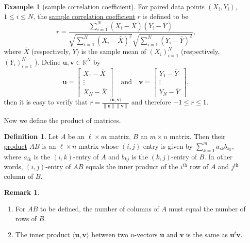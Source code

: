 \documentclass[12pt,letterpaper]{book}
\numberwithin{equation}{section}
\theoremstyle{definition}
\newtheorem{defi}[thm]{\textbf{Definition}}
\newtheorem{example}[thm]{\textbf{Example}}
\newtheorem{remark}[thm]{\textbf{Remark}}
\newcommand{\vu}{\bm{u}}
\newcommand{\vv}{\bm{v}}
\begin{document}
\begin{example}[sample correlation coefficient]
For paired data points $(X_i,Y_i)$, $1\leq i \leq N$, the \underline{sample correlation coefficient} $r$ is defined to be
$$r=\frac{\sum_{i=1}^N (X_i-\bar{X})(Y_i-\bar{Y})}{\sqrt{\sum_{i=1}^N (X_i-\bar{X})^2}\sqrt{\sum_{i=1}^N (Y_i-\bar{Y})^2}},$$ where $\bar{X}$ (respectively, $\bar{Y}$) is the sample mean of $(X_i)_{i=1}^N$ (respectively, $(Y_i)_{i=1}^N$ ). Define $\vu,\vv\in \mathbb{R}^N$ by
$$\vu=\left[\begin{array}{c} X_1-\bar{X}\\ \vdots \\ X_N-\bar{X} \end{array}\right]\quad\text{and}\quad \vv=\left[\begin{array}{c} Y_1-\bar{Y}\\ \vdots \\ Y_N-\bar{Y} \end{array}\right],$$ then it is easy to verify that $r=\frac{\langle \vu,\vv\rangle}{\|\vu\|\|\vv\|}$ and therefore $-1\leq r \leq 1$.
\end{example}

Now we define the product of matrices.

\begin{defi} Let $A$ be an $\ell\times m$ matrix, $B$ an
$m\times n$ matrix. Then their \underline{product} $AB$ is an $\ell\times n$
matrix whose $(i,j)$-entry is given by $\sum_{k=1}^m a_{ik}b_{kj}$,
where $a_{ik}$ is the $(i,k)$-entry of $A$ and $b_{kj}$ is the
$(k,j)$-entry of $B$. In other words, $(i,j)$-entry of $AB$ equals
the inner product of the $i^{\text{th}}$ row of $A$ and
$j^{\text{th}}$ column of $B$.
\end{defi}

\begin{remark}\quad
\begin{enumerate}
\item For $AB$ to be defined, the number of columns of $A$ must equal the number of rows of $B$.
\item The inner product $\langle \vu,\vv \rangle$ between two $n$-vectors $\vu$ and $\vv$ is the same as $\vu^t\vv$.
\end{enumerate}
\end{remark}
\end{document}
